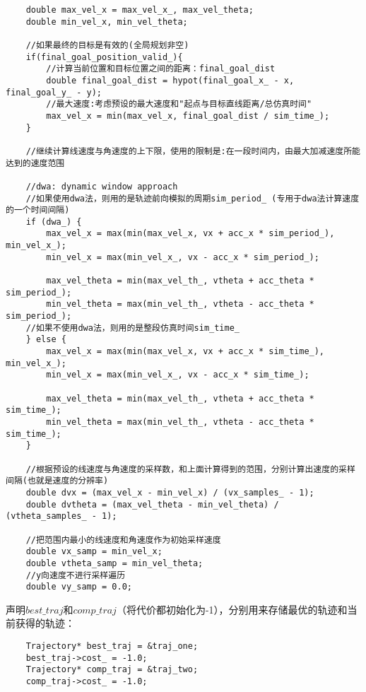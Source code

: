 \documentclass[9pt, oneside]{book}
\begin{document}
\footnotesize
\begin{verbatim}
    double max_vel_x = max_vel_x_, max_vel_theta;
    double min_vel_x, min_vel_theta;

    //如果最终的目标是有效的(全局规划非空)
    if(final_goal_position_valid_){
        //计算当前位置和目标位置之间的距离：final_goal_dist
        double final_goal_dist = hypot(final_goal_x_ - x, final_goal_y_ - y);
        //最大速度:考虑预设的最大速度和"起点与目标直线距离/总仿真时间"
        max_vel_x = min(max_vel_x, final_goal_dist / sim_time_);
    }

    //继续计算线速度与角速度的上下限，使用的限制是:在一段时间内，由最大加减速度所能达到的速度范围

    //dwa: dynamic window approach
    //如果使用dwa法，则用的是轨迹前向模拟的周期sim_period_ (专用于dwa法计算速度的一个时间间隔)
    if (dwa_) {
        max_vel_x = max(min(max_vel_x, vx + acc_x * sim_period_), min_vel_x_);
        min_vel_x = max(min_vel_x_, vx - acc_x * sim_period_);

        max_vel_theta = min(max_vel_th_, vtheta + acc_theta * sim_period_);
        min_vel_theta = max(min_vel_th_, vtheta - acc_theta * sim_period_);
    //如果不使用dwa法，则用的是整段仿真时间sim_time_ 
    } else {
        max_vel_x = max(min(max_vel_x, vx + acc_x * sim_time_), min_vel_x_);
        min_vel_x = max(min_vel_x_, vx - acc_x * sim_time_);

        max_vel_theta = min(max_vel_th_, vtheta + acc_theta * sim_time_);
        min_vel_theta = max(min_vel_th_, vtheta - acc_theta * sim_time_);
    }

    //根据预设的线速度与角速度的采样数，和上面计算得到的范围，分别计算出速度的采样间隔(也就是速度的分辨率)
    double dvx = (max_vel_x - min_vel_x) / (vx_samples_ - 1);
    double dvtheta = (max_vel_theta - min_vel_theta) / (vtheta_samples_ - 1);

    //把范围内最小的线速度和角速度作为初始采样速度
    double vx_samp = min_vel_x;
    double vtheta_samp = min_vel_theta;
    //y向速度不进行采样遍历
    double vy_samp = 0.0;
\end{verbatim}
\normalsize

声明$best\_traj$和$comp\_traj$（将代价都初始化为-1），分别用来存储最优的轨迹和当前获得的轨迹：

\small
\begin{verbatim}
    Trajectory* best_traj = &traj_one;
    best_traj->cost_ = -1.0;
    Trajectory* comp_traj = &traj_two;
    comp_traj->cost_ = -1.0;
\end{verbatim}
\normalsize
\end{document}
